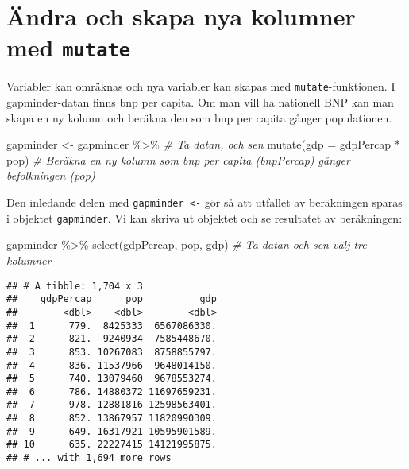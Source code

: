 \documentclass[
]{book}
\newenvironment{Shaded}{\begin{snugshade}}{\end{snugshade}}
\newcommand{\AttributeTok}[1]{\textcolor[rgb]{0.77,0.63,0.00}{#1}}
\newcommand{\CommentTok}[1]{\textcolor[rgb]{0.56,0.35,0.01}{\textit{#1}}}
\newcommand{\FunctionTok}[1]{\textcolor[rgb]{0.00,0.00,0.00}{#1}}
\newcommand{\NormalTok}[1]{#1}
\newcommand{\OtherTok}[1]{\textcolor[rgb]{0.56,0.35,0.01}{#1}}
\newcommand{\SpecialCharTok}[1]{\textcolor[rgb]{0.00,0.00,0.00}{#1}}
\theoremstyle{definition}
\theoremstyle{definition}
\theoremstyle{definition}
\theoremstyle{definition}
\theoremstyle{remark}
\begin{document}
\hypertarget{uxe4ndra-och-skapa-nya-kolumner-med-mutate}{%
\section{\texorpdfstring{Ändra och skapa nya kolumner med \texttt{mutate}}{Ändra och skapa nya kolumner med mutate}}\label{uxe4ndra-och-skapa-nya-kolumner-med-mutate}}

Variabler kan omräknas och nya variabler kan skapas med \texttt{mutate}-funktionen. I gapminder-datan finns bnp per capita. Om man vill ha nationell BNP kan man skapa en ny kolumn och beräkna den som bnp per capita gånger populationen.

\begin{Shaded}
\begin{Highlighting}[]
\NormalTok{gapminder }\OtherTok{\textless{}{-}}\NormalTok{ gapminder }\SpecialCharTok{\%\textgreater{}\%}             \CommentTok{\# Ta datan, och sen}
  \FunctionTok{mutate}\NormalTok{(}\AttributeTok{gdp =}\NormalTok{ gdpPercap }\SpecialCharTok{*}\NormalTok{ pop)        }\CommentTok{\# Beräkna en ny kolumn som bnp per capita (bnpPercap) gånger befolkningen (pop)}
\end{Highlighting}
\end{Shaded}

Den inledande delen med \texttt{gapminder\ \textless{}-} gör så att utfallet av beräkningen sparas i objektet \texttt{gapminder}.
Vi kan skriva ut objektet och se resultatet av beräkningen:

\begin{Shaded}
\begin{Highlighting}[]
\NormalTok{gapminder }\SpecialCharTok{\%\textgreater{}\%} \FunctionTok{select}\NormalTok{(gdpPercap, pop, gdp)        }\CommentTok{\# Ta datan och sen välj tre kolumner}
\end{Highlighting}
\end{Shaded}

\begin{verbatim}
## # A tibble: 1,704 x 3
##    gdpPercap      pop          gdp
##        <dbl>    <dbl>        <dbl>
##  1      779.  8425333  6567086330.
##  2      821.  9240934  7585448670.
##  3      853. 10267083  8758855797.
##  4      836. 11537966  9648014150.
##  5      740. 13079460  9678553274.
##  6      786. 14880372 11697659231.
##  7      978. 12881816 12598563401.
##  8      852. 13867957 11820990309.
##  9      649. 16317921 10595901589.
## 10      635. 22227415 14121995875.
## # ... with 1,694 more rows
\end{verbatim}
\end{document}
